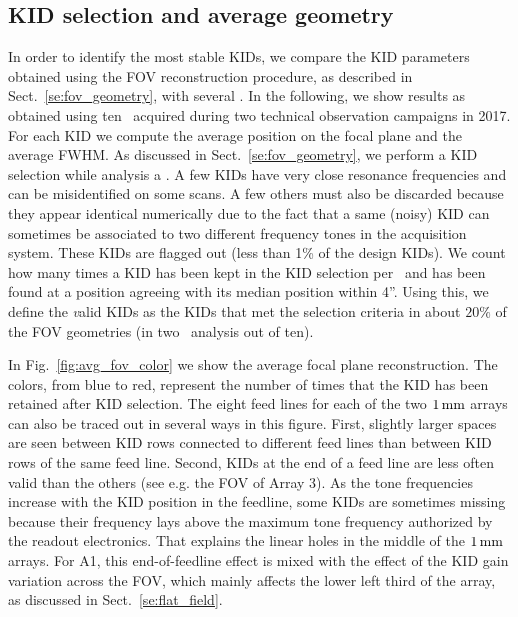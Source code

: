 \subsection{KID selection and average geometry}
\label{se:avg_kidpar}

In order to identify the most stable KIDs, we compare the KID parameters
obtained using the FOV reconstruction procedure, as described in
Sect.~\ref{se:fov_geometry}, with several \bms. In the following, we
show results as obtained using {\lp ten} \bms\ acquired during two
technical observation campaigns in 2017.
For each KID we compute the average position on the focal plane and
the average FWHM. 
As discussed in Sect.~\ref{se:fov_geometry}, we perform a KID
selection while analysis a \bms. A few KIDs have very close resonance
frequencies and can be misidentified on some scans. A few others must
also be discarded because they appear identical
numerically due to the fact that a same (noisy) KID can sometimes be
associated to two different frequency tones in the acquisition system.
These KIDs are flagged out (less than 1\% of the design KIDs).
{\lp We count how many times a KID has been kept in
the KID selection per \bm\ and has been found at a position agreeing
with its median position within 4''.}
Using this, we define the {\emph valid} KIDs as the KIDs that met the selection
criteria in about {\lp $20\%$} of the FOV geometries (in two \bm\
analysis out of ten).

In Fig.~\ref{fig:avg_fov_color} we show the average focal plane
reconstruction. The colors, from blue to red,
represent the number of times that the KID has been retained after
KID selection. The eight feed lines for each of the two
$1\,\rm{mm}$ arrays {\lp can also be traced out in several ways} in this
figure. First, slightly larger spaces are seen between KID rows
connected to different feed lines than between KID rows of the same
feed line. Second, KIDs at the end of a feed line are less often valid
than the others
(see e.g. the FOV of Array 3). As the tone frequencies
increase with the KID position in the feedline, some KIDs are
sometimes missing because their frequency lays above the maximum tone
frequency authorized by the readout electronics. That explains the
linear holes in the middle of the $1\,\rm{mm}$ arrays. For A1, this
end-of-feedline effect is mixed with the effect of the KID gain
variation across the FOV, which mainly affects the lower left third of
the array, as discussed in Sect.~\ref{se:flat_field}.

